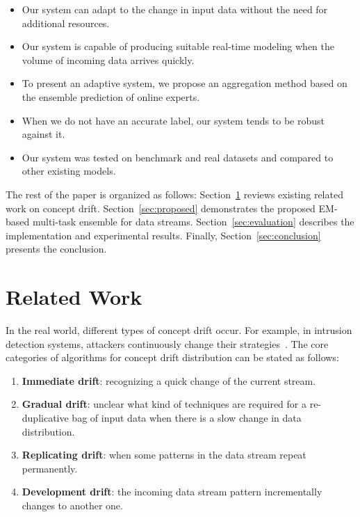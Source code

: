 \documentclass[12pt,a4paper]{article}
\begin{document}
	\begin{itemize}
		\item Our system can adapt to the change in input data without the need for additional resources.
		\item Our system is capable of producing suitable real-time modeling when the volume of incoming data arrives quickly.
		\item To present an adaptive system, we propose an aggregation method based on the ensemble prediction of online experts.
		\item When we do not have an accurate label, our system tends to be robust against it.
		\item Our system was tested on benchmark and real datasets and compared to other existing models.
	\end{itemize}
	
	The rest of the paper is organized as follows: Section~\ref{sec:related} reviews existing related work on concept drift. Section~\ref{sec:proposed} demonstrates the proposed EM-based multi-task ensemble for data streams. Section~\ref{sec:evaluation} describes the implementation and experimental results. Finally, Section~\ref{sec:conclusion} presents the conclusion.
	
	\section{Related Work}
	\label{sec:related}
	
	In the real world, different types of concept drift occur. For example, in intrusion detection systems, attackers continuously change their strategies~\cite{Liang2017}. The core categories of algorithms for concept drift distribution can be stated as follows:
	\begin{enumerate}
		\item \textbf{Immediate drift}: recognizing a quick change of the current stream.
		\item \textbf{Gradual drift}: unclear what kind of techniques are required for a re-duplicative bag of input data when there is a slow change in data distribution.
		\item \textbf{Replicating drift}: when some patterns in the data stream repeat permanently.
		\item \textbf{Development drift}: the incoming data stream pattern incrementally changes to another one.
	\end{enumerate}
	
\end{document}
